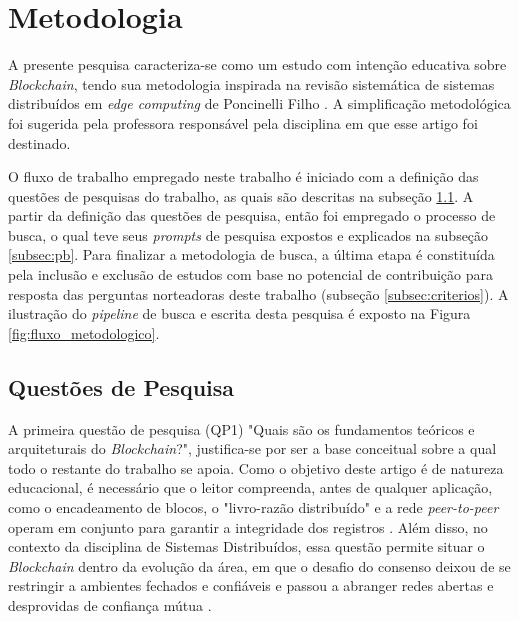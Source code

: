 \section{Metodologia}
\label{sec:metodologia}

A presente pesquisa caracteriza-se como um estudo com intenção educativa sobre \textit{Blockchain}, tendo sua metodologia inspirada na revisão sistemática de sistemas distribuídos em \textit{edge computing} de Poncinelli Filho \cite{SystRevEdge}. A simplificação metodológica foi sugerida pela professora responsável pela disciplina em que esse artigo foi destinado.

O fluxo de trabalho empregado neste trabalho é iniciado com a definição das questões de pesquisas do trabalho, as quais são descritas na subseção \ref{subsec:qp}. A partir da definição das questões de pesquisa, então foi empregado o processo de busca, o qual teve seus \textit{prompts} de pesquisa expostos e explicados na subseção \ref{subsec:pb}. Para finalizar a metodologia de busca, a última etapa é constituída pela inclusão e exclusão de estudos com base no potencial de contribuição para resposta das perguntas norteadoras deste trabalho (subseção \ref{subsec:criterios}). A ilustração do \textit{pipeline} de busca e escrita desta pesquisa é exposto na Figura \ref{fig:fluxo_metodologico}.



\subsection{Questões de Pesquisa}
\label{subsec:qp}

A primeira questão de pesquisa (QP1) "Quais são os fundamentos teóricos e arquiteturais do \textit{Blockchain}?", justifica-se por ser a base conceitual sobre a qual todo o restante do trabalho se apoia. Como o objetivo deste artigo é de natureza educacional, é necessário que o leitor compreenda, antes de qualquer aplicação, como o encadeamento de blocos, o "livro-razão distribuído" e a rede \textit{peer-to-peer} operam em conjunto para garantir a integridade dos registros \cite{di2017blockchain}. Além disso, no contexto da disciplina de Sistemas Distribuídos, essa questão permite situar o \textit{Blockchain} dentro da evolução da área, em que o desafio do consenso deixou de se restringir a ambientes fechados e confiáveis e passou a abranger redes abertas e desprovidas de confiança mútua \cite{Li2021,Xiao2020}.

